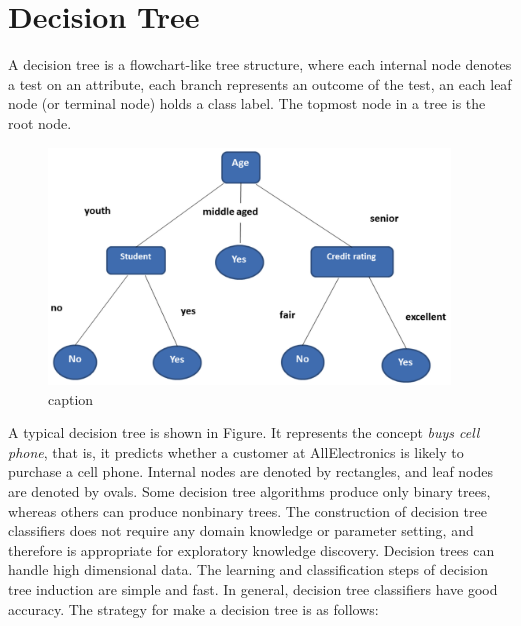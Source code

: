\section{Decision Tree}
A decision tree is a flowchart-like tree structure, where each internal node denotes a test on an attribute, each branch represents an outcome of the test, an each leaf node (or terminal node) holds a class label. The topmost node in a tree is the root node.
\begin{figure}[htbp]
  \centering
  \includegraphics[width=0.95\textwidth]{arbol}
  \caption{caption}
  \label{fig:label}
\end{figure}
A typical decision tree is shown in Figure.  It represents the concept \textit{buys cell phone}, that is, it predicts whether a customer at AllElectronics is likely to purchase a cell phone.
Internal nodes are denoted by rectangles, and leaf nodes are denoted by ovals.  Some decision tree algorithms produce only binary trees, whereas others can produce nonbinary trees.
The construction of decision tree classifiers does not require any domain knowledge or parameter setting, and therefore is appropriate for exploratory knowledge discovery.  Decision trees can handle high dimensional data.  The learning and classification steps of decision tree induction are simple and fast.  In general, decision tree classifiers have good accuracy.
The strategy for make a decision tree is as follows:
